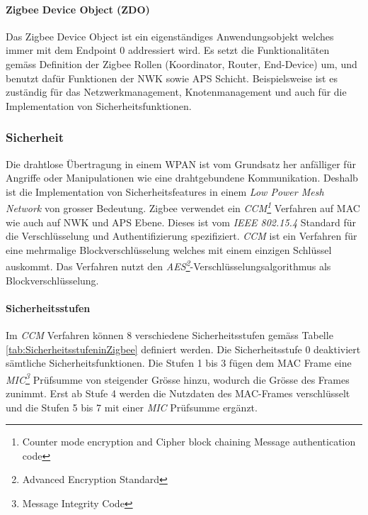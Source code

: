 \paragraph{Zigbee Device Object (ZDO)}
Das Zigbee Device Object ist ein eigenständiges Anwendungsobjekt welches immer mit dem Endpoint 0 addressiert wird.
Es setzt die Funktionalitäten gemäss Definition der Zigbee Rollen (Koordinator, Router, End-Device) um, und benutzt dafür Funktionen der NWK sowie APS Schicht.
Beispielsweise ist es zuständig für das Netzwerkmanagement, Knotenmanagement und auch für die Implementation von Sicherheitsfunktionen.

\subsubsection{Sicherheit}\label{subsucsec:ZigbeeSicherheit}
Die drahtlose Übertragung in einem WPAN ist vom Grundsatz her anfälliger für Angriffe oder Manipulationen wie eine drahtgebun­dene Kommunikation.
Deshalb ist die Implementation von Sicherheitsfeatures in einem \textit{Low Power Mesh Network} von grosser Bedeutung.
Zigbee verwendet ein \textit{CCM\footnote{Counter mode encryption and Cipher block chaining Message authentication code}} Verfahren auf MAC wie auch auf NWK und APS Ebene.
Dieses ist vom \textit{IEEE 802.15.4} Standard für die Verschlüsselung und Authentifizierung spezifiziert.
\textit{CCM} ist ein Verfahren für eine mehrmalige Blockverschlüsselung welches mit einem einzigen Schlüssel auskommt.
Das Verfahren nutzt den \textit{AES\footnote{Advanced Encryption Standard}}-Verschlüsselungsalgorithmus als Blockverschlüsselung.

\paragraph{Sicherheitsstufen}
Im \textit{CCM} Verfahren können 8 verschiedene Sicherheitsstufen gemäss Tabelle \ref{tab:SicherheitsstufeninZigbee} definiert werden.
Die Sicherheitsstufe 0 deaktiviert sämtliche Sicherheitsfunktionen.
Die Stufen 1 bis 3 fügen dem MAC Frame eine \textit{MIC\footnote{Message Integrity Code}} Prüfsumme von steigender Grösse hinzu, wodurch die Grösse des Frames zunimmt.
Erst ab Stufe 4 werden die Nutzdaten des MAC-Frames verschlüsselt und die Stufen 5 bis 7 mit einer \textit{MIC} Prüfsumme ergänzt. \cite[S.~334]{markus_krause_rainer_konrad_zigbee_2014}

